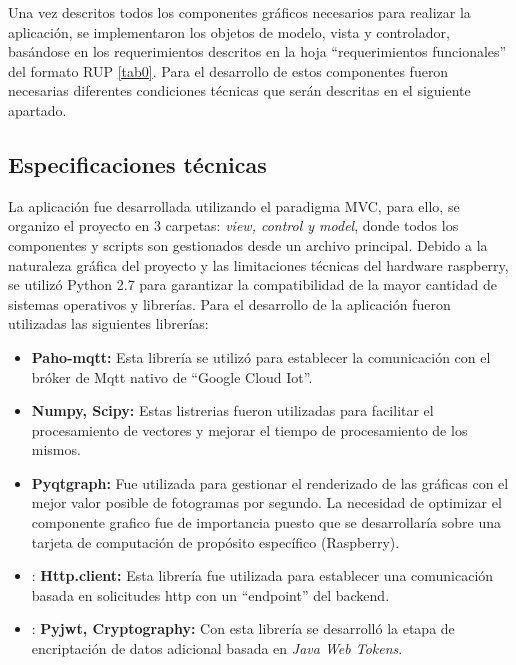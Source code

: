 
Una vez descritos todos los componentes gráficos necesarios para realizar la aplicación, se implementaron los objetos de modelo, vista y controlador, basándose en los requerimientos descritos en la hoja ``requerimientos funcionales'' del formato RUP \ref{tab0}. Para el desarrollo de estos componentes fueron necesarias diferentes condiciones técnicas que serán descritas en el siguiente apartado.

\subsection{Especificaciones técnicas}

La aplicación fue desarrollada utilizando el paradigma MVC, para ello, se organizo el proyecto en 3 carpetas: \textit{view, control y model}, donde todos los componentes y scripts son gestionados desde un archivo principal. Debido a la naturaleza gráfica del proyecto y las limitaciones técnicas del hardware raspberry, se utilizó Python 2.7 para garantizar la compatibilidad de la mayor cantidad de sistemas operativos y librerías. 
Para el desarrollo de la aplicación fueron utilizadas las siguientes librerías:

\begin{itemize}
	\item \textbf{Paho-mqtt:} Esta librería se utilizó para establecer la comunicación con el bróker de Mqtt nativo de “Google Cloud Iot”.
	\item \textbf{Numpy, Scipy:} Estas listrerias fueron utilizadas para facilitar el procesamiento de vectores y mejorar el tiempo de procesamiento de los mismos.
	\item \textbf{Pyqtgraph:} Fue utilizada para gestionar el renderizado de las gráficas con el mejor valor posible de fotogramas por segundo. La necesidad de optimizar el componente grafico fue de importancia puesto que se desarrollaría sobre una tarjeta de computación de propósito específico (Raspberry).
	\item: \textbf{Http.client:} Esta librería fue utilizada para establecer una comunicación basada en solicitudes http con un ``endpoint'' del backend.
	\item: \textbf{Pyjwt, Cryptography:} Con esta librería se desarrolló la etapa de encriptación de datos adicional basada en \textit{Java Web Tokens}.	
\end{itemize}

